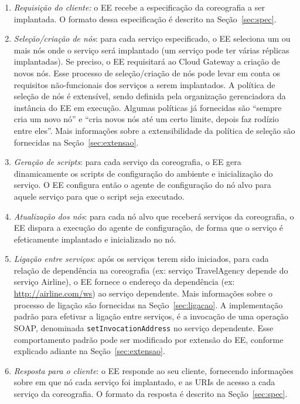 \begin{enumerate}

\item \emph{Requisição do cliente:} o EE recebe a especificação da coreografia a ser implantada.
O formato dessa especificação é descrito na Seção~\ref{sec:spec}.

\item \emph{Seleção/criação de nós}: para cada serviço especificado, o EE seleciona um ou mais nós 
onde o serviço será implantado (um serviço pode ter várias réplicas implantadas). 
Se preciso, o EE requisitará ao Cloud Gateway a criação de novos nós.
Esse processo de seleção/criação de nós pode levar em conta os requisitos não-funcionais
dos serviços a serem implantados.
A política de seleção de nós é extensível, sendo definida pela organização
gerenciadora da instância do EE em execução. Algumas políticas já fornecidas são
``sempre cria um novo nó'' e ``cria novos nós até um certo limite, depois faz rodízio entre eles''.
Mais informações sobre a extensibilidade da política de seleção
são fornecidas na Seção~\ref{sec:extensao}.

\item \emph{Geração de scripts}: para cada serviço da coreografia, o EE gera dinamicamente os scripts de configuração do ambiente e inicialização do serviço. 
O EE configura então o agente de configuração do nó alvo para aquele serviço 
para que o script seja executado.

\item \emph{Atualização dos nós}: para cada nó alvo que receberá serviços da coreografia,
o EE dispara a execução do agente de configuração, de forma que o serviço é efeticamente
implantado e inicializado no nó.

\item \emph{Ligação entre serviços}: após os serviços terem sido iniciados, 
para cada relação de dependência na coreografia (ex: serviço \textsf{TravelAgency}
depende do serviço \textsf{Airline}), o EE fornece o endereço da dependência 
(ex: \url{http://airline.com/ws}) ao serviço dependente.
Mais informações sobre o processo de ligação são fornecidas na Seção~\ref{sec:ligacao}.
A implementação padrão para efetivar a ligação entre serviços, é a invocação de uma
operação SOAP, denominada \texttt{setInvocationAddress} no serviço dependente. 
Esse comportamento padrão pode ser modificado por extensão do EE,
conforme explicado adiante na Seção~\ref{sec:extensao}.

\item \emph{Resposta para o cliente}: o EE responde ao seu cliente,
fornecendo informações sobre em que nó cada serviço foi implantado,
e as URIs de acesso a cada serviço da coreografia.
O formato da resposta é descrito na Seção~\ref{sec:spec}.

\end{enumerate}

